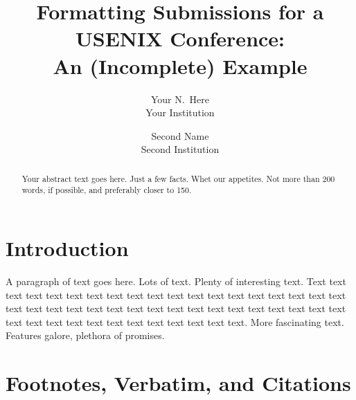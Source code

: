 

\date{}

\title{\Large \bf Formatting Submissions for a USENIX Conference:\\
  An (Incomplete) Example}

\author{
{\rm Your N.\ Here}\\
Your Institution
\and
{\rm Second Name}\\
Second Institution
} %

\maketitle

\begin{abstract}
Your abstract text goes here. Just a few facts. Whet our appetites.
Not more than 200 words, if possible, and preferably closer to 150.
\end{abstract}


\section{Introduction}

A paragraph of text goes here. Lots of text. Plenty of interesting
text. Text text text text text text text text text text text text text
text text text text text text text text text text text text text text
text text text text text text text text text text text text text text
text text text text text text text.
More fascinating text. Features galore, plethora of promises.

\section{Footnotes, Verbatim, and Citations}

